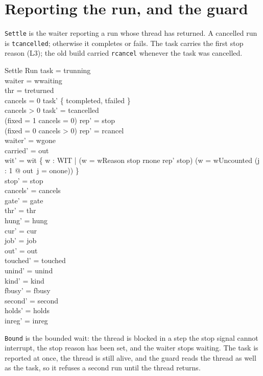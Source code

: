 \documentclass[a4paper,10pt,fleqn]{article}
\newcommand{\field}[1]{\texttt{#1}}
\begin{document}
\section{Reporting the run, and the guard}
\label{sec:report}

\field{Settle} is the waiter reporting a run whose thread has returned. A
cancelled run is \field{tcancelled}; otherwise it completes or fails. The task
carries the first stop reason (L3); the old build carried \field{rcancel}
whenever the task was cancelled.

\begin{schema}{Settle}
\Delta Run
\where
task = trunning \\
waiter = wwaiting \\
thr = treturned \\
cancels = 0 \implies task' \in \{ tcompleted, tfailed \} \\
cancels > 0 \implies task' = tcancelled \\
(fixed = 1 \lor cancels = 0) \implies rep' = stop \\
(fixed = 0 \land cancels > 0) \implies rep' = rcancel \\
waiter' = wgone \\
carried' = out \\
wit' = wit \cup \{ w : WIT |
  (w = wReason \land stop \neq rnone \land rep' \neq stop)
  \lor (w = wUncounted \land (\exists j : 1  @ out~j = onone)) \} \\
stop' = stop \\
cancels' = cancels \\
gate' = gate \\
thr' = thr \\
hung' = hung \\
cur' = cur \\
job' = job \\
out' = out \\
touched' = touched \\
unind' = unind \\
kind' = kind \\
fbusy' = fbusy \\
second' = second \\
holds' = holds \\
inreg' = inreg
\end{schema}

\field{Bound} is the bounded wait: the thread is blocked in a step the stop
signal cannot interrupt, the stop reason has been set, and the waiter stops
waiting. The task is reported at once, the thread is still alive, and the guard
reads the thread as well as the task, so it refuses a second run until the
thread returns.
\end{document}
